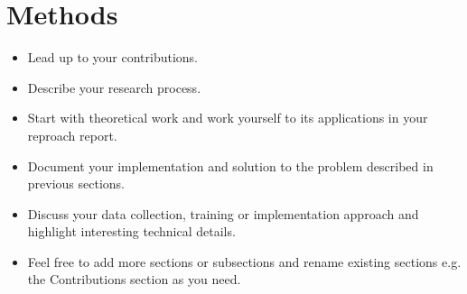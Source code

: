 \section{Methods}

\begin{itemize}
	\item Lead up to your contributions.
	\item Describe your research process.
	\item Start with theoretical work and work yourself to its applications in your reproach report.
	\item Document your implementation and solution to the problem described in previous sections.
	\item Discuss your data collection, training or implementation approach and highlight interesting technical details.
	\item Feel free to add more sections or subsections and rename existing sections e.g. the Contributions section as you need.
\end{itemize}
